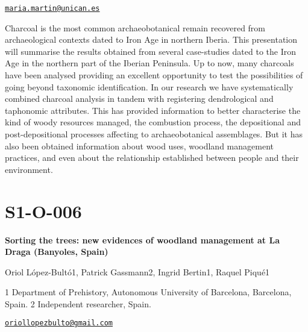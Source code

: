 \documentclass[
]{book}
\begin{document}
\href{mailto:maria.martin@unican.es}{\nolinkurl{maria.martin@unican.es}}

Charcoal is the most common archaeobotanical remain recovered from
archaeological contexts dated to Iron Age in northern Iberia. This
presentation will summarise the results obtained from several
case-studies dated to the Iron Age in the northern part of the Iberian
Peninsula. Up to now, many charcoals have been analysed providing an
excellent opportunity to test the possibilities of going beyond
taxonomic identification. In our research we have systematically
combined charcoal analysis in tandem with registering dendrological and
taphonomic attributes. This has provided information to better
characterise the kind of woody resources managed, the combustion
process, the depositional and post-depositional processes affecting to
archaeobotanical assemblages. But it has also been obtained information
about wood uses, woodland management practices, and even about the
relationship established between people and their environment.

\hypertarget{s1-o-006}{%
\section*{S1-O-006}\label{s1-o-006}}

\textbf{Sorting the trees: new evidences of woodland management at La Draga
(Banyoles, Spain)}

Oriol López-Bultó1, Patrick Gassmann2, Ingrid Bertin1, Raquel Piqué1

1 Department of Prehistory, Autonomous University of Barcelona,
Barcelona, Spain. 2 Independent researcher, Spain.

\href{mailto:oriollopezbulto@gmail.com}{\nolinkurl{oriollopezbulto@gmail.com}}
\end{document}
